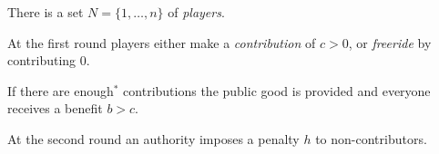 \documentclass[
    preview, 
    varwidth=6.5cm, 
    border={0pt 1pt 1pt 1pt}
    ]{standalone} %
\begin{document}
    















    There is a set \(N = \{1, \dots, n\}\) of \emph{players}.
    
    \vspace{1em}
    At the first round players either 
    make a \emph{contribution} of \(c > 0\), or \emph{freeride} by contributing \(0\).

    \vspace{1em}
    If there are enough\(^*\) contributions 
    the public good is provided and everyone receives a benefit \(b > c\).

    \vspace{1em}
    At the second round an authority imposes a penalty \(h\) to 
    non-contributors.
\end{document}
